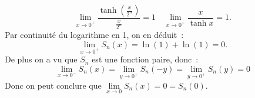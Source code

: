 \begin{exercice}
\begin{enumerate}
\begin{enumerate}
\begin{equation*}
                        \lim\limits_{x \to 0^+} \frac{\tanh\left(\frac{x}{2^n}\right)}{\frac{x}{2^n}} = 1 \quad \lim\limits_{x \to 0^+} \frac{x}{\tanh x} = 1.
                    \end{equation*}
                    Par continuité du logarithme en 1, on en déduit~:
                    \begin{equation*}
                        \lim\limits_{x \to 0^+} S_n(x) = \ln(1) + \ln(1) = 0.
                    \end{equation*}
                    De plus on a vu que \(S_n\) est une fonction paire, donc~:
                    \begin{equation*}
                        \lim\limits_{x \to 0^-} S_n(x) = \lim\limits_{y \to 0^+} S_n(-y) = \lim\limits_{y \to 0^+} S_n(y) = 0 
                    \end{equation*}
                    Donc on peut conclure que \(\lim\limits_{x \to 0} S_n(x) = 0 = S_n(0)\).
            \end{enumerate}
    \end{enumerate}
\end{exercice}
